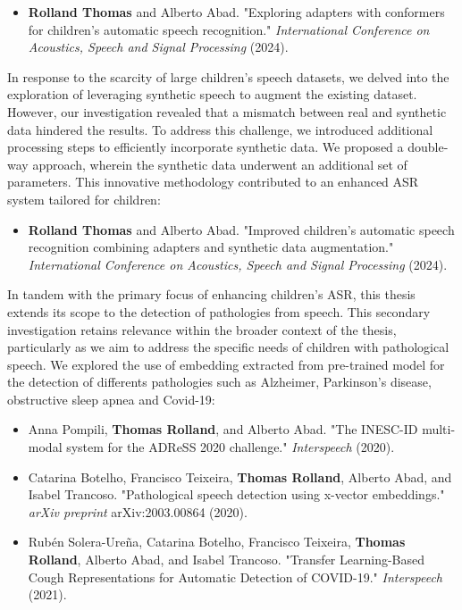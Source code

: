 \begin{itemize}
    \item \textbf{Rolland Thomas} and Alberto Abad. "Exploring adapters with conformers for children’s automatic speech recognition." \textit{ International Conference on Acoustics, Speech and Signal Processing} (2024).
\end{itemize}

In response to the scarcity of large children's speech datasets, we delved into the exploration of leveraging synthetic speech to augment the existing dataset. However, our investigation revealed that a mismatch between real and synthetic data hindered the results. To address this challenge, we introduced additional processing steps to efficiently incorporate synthetic data. We proposed a double-way approach, wherein the synthetic data underwent an additional set of parameters. This innovative methodology contributed to an enhanced ASR system tailored for children:

\begin{itemize}
    \item \textbf{Rolland Thomas} and Alberto Abad. "Improved children’s automatic speech recognition combining adapters and synthetic data augmentation." \textit{International Conference on Acoustics, Speech and Signal Processing} (2024).
\end{itemize}

In tandem with the primary focus of enhancing children's ASR, this thesis extends its scope to the detection of pathologies from speech. This secondary investigation retains relevance within the broader context of the thesis, particularly as we aim to address the specific needs of children with pathological speech. We explored the use of embedding extracted from pre-trained model for the detection of differents pathologies such as Alzheimer, Parkinson's disease, obstructive sleep apnea and Covid-19:

\begin{itemize}
    \item Anna Pompili, \textbf{Thomas Rolland}, and Alberto Abad. "The INESC-ID multi-modal system for the ADReSS 2020 challenge." \textit{Interspeech} (2020).
    \item Catarina Botelho, Francisco Teixeira, \textbf{Thomas Rolland}, Alberto Abad, and Isabel Trancoso. "Pathological speech detection using x-vector embeddings." \textit{arXiv preprint} arXiv:2003.00864 (2020).
    \item Rubén Solera-Ureña, Catarina Botelho, Francisco Teixeira, \textbf{Thomas Rolland}, Alberto Abad, and Isabel Trancoso. "Transfer Learning-Based Cough Representations for Automatic Detection of COVID-19." \textit{Interspeech} (2021).
\end{itemize}


